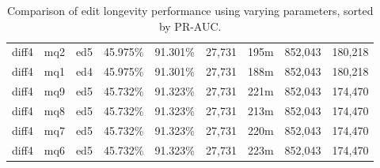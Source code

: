 \begin{sidewaystable}[!ph]
\begin{center}
\begin{tabular}{|c|c|c||c|c||c|c|c|c|}
diff4 & mq2 & ed5 & 45.975\% & 91.301\% & 27,731 & 195m & 852,043 & 180,218 \\
diff4 & mq1 & ed4 & 45.975\% & 91.301\% & 27,731 & 188m & 852,043 & 180,218 \\
diff4 & mq9 & ed5 & 45.732\% & 91.323\% & 27,731 & 221m & 852,043 & 174,470 \\
diff4 & mq8 & ed5 & 45.732\% & 91.323\% & 27,731 & 213m & 852,043 & 174,470 \\
diff4 & mq7 & ed5 & 45.732\% & 91.323\% & 27,731 & 220m & 852,043 & 174,470 \\
diff4 & mq6 & ed5 & 45.732\% & 91.323\% & 27,731 & 223m & 852,043 & 174,470 \\
\hline
\end{tabular}
\end{center}
\caption{Comparison of edit longevity performance using
    varying parameters, sorted by PR-AUC.}
\label{tab:editshoutB}
\end{sidewaystable}
\clearpage
